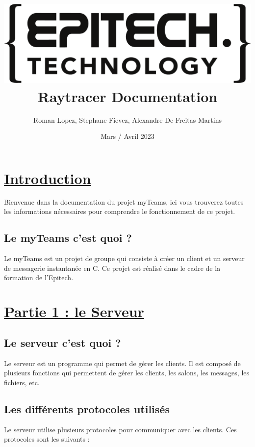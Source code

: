 \documentclass{report}
\title{\includegraphics{epitechLogo.png} \\ \vspace{0.5cm} Raytracer Documentation}
\author{Roman Lopez, Stephane Fievez, Alexandre De Freitas Martins}
\date{Mars / Avril 2023}
\begin{document}
\maketitle

\section{\underline{Introduction}}

Bienvenue dans la documentation du projet myTeams, ici vous trouverez toutes les informations nécessaires pour comprendre le fonctionnement de ce projet.

\subsection{Le myTeams c'est quoi ?}

Le myTeams est un projet de groupe qui consiste à créer un client et un serveur de messagerie instantanée en C. Ce projet est réalisé dans le cadre de la formation de l'Epitech.

\section{\underline{Partie 1 : le Serveur}}

\subsection{Le serveur c'est quoi ?}

Le serveur est un programme qui permet de gérer les clients. Il est composé de plusieurs fonctions qui permettent de gérer les clients, les salons, les messages, les fichiers, etc.

\subsection{Les différents protocoles utilisés}

Le serveur utilise plusieurs protocoles pour communiquer avec les clients. Ces protocoles sont les suivants :
\newline
\end{document}

